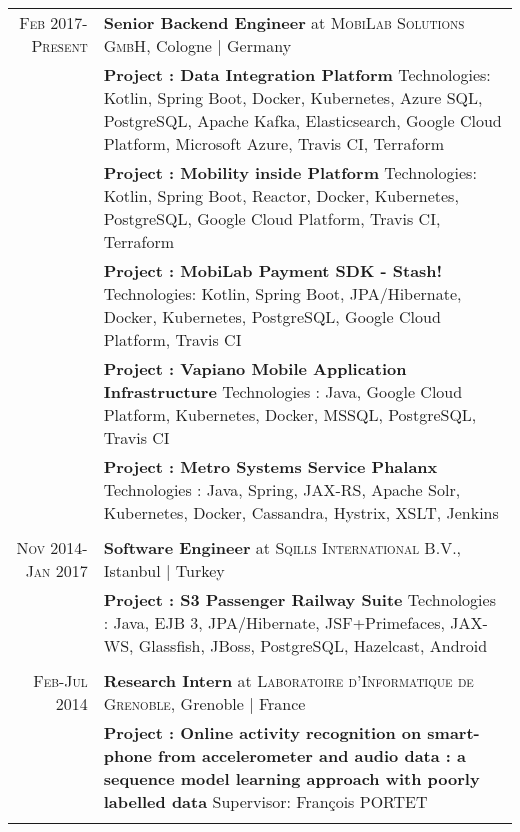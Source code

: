 \documentclass[a4paper,10pt]{article} %
\begin{document}
\begin{tabular}{r|p{13cm}}

\textsc{Feb 2017-Present} & \textbf{Senior Backend Engineer} at \textsc{MobiLab Solutions GmbH}, Cologne | Germany \emph{}\\
& \footnotesize{\textbf{Project : Data Integration Platform}
\newline
Technologies: Kotlin, Spring Boot, Docker, Kubernetes, Azure SQL, PostgreSQL, Apache Kafka, Elasticsearch, Google Cloud Platform, Microsoft Azure, Travis CI, Terraform
}\\
& \footnotesize{\textbf{Project : Mobility inside Platform}
\newline
Technologies: Kotlin, Spring Boot, Reactor, Docker, Kubernetes, PostgreSQL, Google Cloud Platform, Travis CI, Terraform
}\\
& \footnotesize{\textbf{Project : MobiLab Payment SDK - Stash!}
\newline
Technologies: Kotlin, Spring Boot, JPA/Hibernate, Docker, Kubernetes, PostgreSQL, Google Cloud Platform, Travis CI 
}\\
& \footnotesize{\textbf{Project : Vapiano Mobile Application Infrastructure}
\newline
Technologies : Java, Google Cloud Platform, Kubernetes, Docker, MSSQL, PostgreSQL, Travis CI  
}\\
& \footnotesize{\textbf{Project : Metro Systems Service Phalanx}
\newline
Technologies : Java, Spring, JAX-RS, Apache Solr, Kubernetes, Docker, Cassandra, Hystrix, XSLT, Jenkins 
}\\
\multicolumn{2}{c}{} \\

\textsc{Nov 2014-Jan 2017} & \textbf{Software Engineer} at \textsc{Sqills International B.V.}, Istanbul | Turkey \emph{}\\
& \footnotesize{\textbf{Project : S3 Passenger Railway Suite}
\newline
Technologies : Java, EJB 3, JPA/Hibernate, JSF+Primefaces, JAX-WS, Glassfish, JBoss, PostgreSQL, Hazelcast, Android
}\\
\multicolumn{2}{c}{} \\


\textsc{Feb-Jul 2014} & \textbf{Research Intern} at \textsc{Laboratoire d'Informatique de Grenoble}, Grenoble | France \emph{}\\
& \footnotesize{\textbf{Project : Online activity recognition on smart-phone from accelerometer and audio data : a sequence model learning approach with poorly labelled data}
\newline
Supervisor: François PORTET
}\\
\multicolumn{2}{c}{} \\

\end{tabular}
\end{document}
